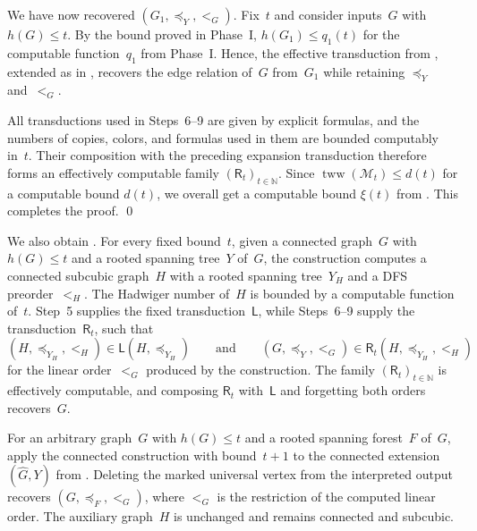 \documentclass[1p,number,11pt]{elsarticle}
\theoremstyle{plain}
\renewcommand{\leq}{\leqslant}
\begin{document}
We have now recovered $(G_1,\preceq_Y,<_G)$. Fix~$t$ and consider inputs~$G$
with $h(G)\leq t$. By the bound proved in Phase~I,
$h(G_1)\leq q_1(t)$
for the computable function~$q_1$ from Phase~I. Hence, the effective transduction from , extended as in , recovers
the edge relation of~$G$ from~$G_1$ while retaining $\preceq_Y$ and~$<_G$.

All transductions used in Steps~6--9 are given by explicit formulas, and the
numbers of copies, colors, and formulas used in them are bounded computably in~$t$. Their composition with the preceding expansion
transduction therefore forms an effectively computable family
$(\mathsf R_t)_{t\in\mathbb N}$. Since
$\operatorname{tww}(\mathscr M_t)\leq d(t)$ for a computable bound $d(t)$, we overall get a computable bound $\xi(t)$ from . 
This completes the proof.
\hfill\qed


\bigskip

We also obtain . For every fixed bound~$t$,
given a connected graph~$G$ with $h(G)\leq t$ and a rooted spanning
tree~$Y$ of~$G$, the construction computes a connected subcubic graph~$H$
with a rooted spanning tree~$Y_H$ and a DFS preorder~$<_H$.
The Hadwiger number of~$H$ is bounded by a computable function of~$t$.
Step~5 supplies the fixed transduction~$\mathsf L$, while
Steps~6--9 supply the transduction~$\mathsf R_t$, such that
\[
    (H,\preceq_{Y_H},{<_H})\in\mathsf L(H,\preceq_{Y_H})
    \qquad\text{and}\qquad
    (G,\preceq_Y,{<_G})\in\mathsf R_t(H,\preceq_{Y_H},{<_H})
\]
for the linear order~$<_G$ produced by the construction.
The family $(\mathsf R_t)_{t\in\mathbb N}$ is effectively computable,
and composing $\mathsf R_t$ with~$\mathsf L$ and forgetting both
orders recovers~$G$.

For an arbitrary graph~$G$ with $h(G)\leq t$ and a rooted spanning forest~$F$ of~$G$, apply the connected construction with bound~$t+1$ to the connected extension $(\widehat G,Y)$ from .
Deleting the marked universal vertex from the interpreted output recovers $(G,\preceq_F,<_G)$, where $<_G$ is the restriction of the computed linear order.
The auxiliary graph~$H$ is unchanged and remains connected and subcubic.
\end{document}
